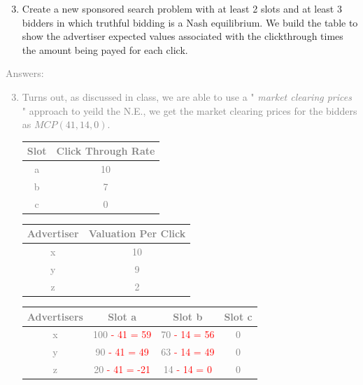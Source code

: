 \documentclass[11pt]{article}
\begin{document}
\begin{enumerate}
	\setcounter{enumi}{2}
	\item Create a new sponsored search problem with at least 2 slots and at least 3 bidders in which truthful bidding is a Nash equilibrium.  We build the table to show the advertiser expected values associated with the clickthrough times the amount being payed for each click.
\end{enumerate}
\textcolor{gray}{
Answers:
\begin{enumerate}
	\setcounter{enumi}{2}
	\item Turns out, as discussed in class, we are able to use a " \textit{market clearing prices} " approach to yeild the N.E., we get the market clearing prices for the bidders as $MCP(41, 14, 0)$.  \\
	\begin{center}
		\begin{tabular}{ |c|c|} 
			 \hline
			 Slot & Click Through Rate \\ 
			 \hline\hline
			 a & 10 \\ 
			 \hline
			 b & 7 \\ 
	 		\hline
			 c & 0 \\ 
	 		\hline
		\end{tabular}
	\end{center}
	\begin{center}
		\begin{tabular}{ |c|c| } 
			 \hline
			 Advertiser & Valuation Per Click \\ 
			 \hline\hline
			 x & 10 \\
			 \hline 
			 y & 9 \\
			 \hline
			z & 2 \\ 
			 \hline
		\end{tabular}
	\end{center}
	\begin{center}
		\begin{tabular}{ |c|c|c|c| } 
			\hline
			Advertisers & Slot a & Slot b & Slot c\\
			\hline \hline
			x 	& 	100 \textcolor{red}{- 41 = 59} 	& 	70 \textcolor{red}{ - 14 = 56} 	& 0 \\  %
			\hline
			y 	& 	90 \textcolor{red}{- 41 = 49} 	& 	63 \textcolor{red}{ - 14 = 49} 	& 0 \\  %
			\hline
			z 	& 	20 \textcolor{red}{- 41 = -21}	& 	14 \textcolor{red}{ - 14 = 0} 	& 0 \\  %
			\hline
		\end{tabular}

\end{center}
\end{enumerate}}
\end{document}
